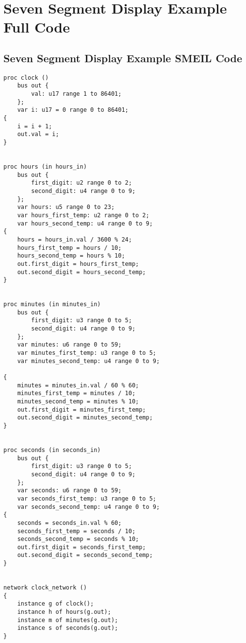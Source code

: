 \chapter{Seven Segment Display Example Full Code}
\label{app:seven_segments}
\section*{Seven Segment Display Example SMEIL Code}
\begin{verbatim}
proc clock ()
    bus out {
        val: u17 range 1 to 86401;
    };
    var i: u17 = 0 range 0 to 86401;
{
    i = i + 1;
    out.val = i;
}


proc hours (in hours_in)
    bus out {
        first_digit: u2 range 0 to 2;
        second_digit: u4 range 0 to 9;
    };
    var hours: u5 range 0 to 23;
    var hours_first_temp: u2 range 0 to 2;
    var hours_second_temp: u4 range 0 to 9;
{
    hours = hours_in.val / 3600 % 24;
    hours_first_temp = hours / 10;
    hours_second_temp = hours % 10;
    out.first_digit = hours_first_temp;
    out.second_digit = hours_second_temp;
}


proc minutes (in minutes_in)
    bus out {
        first_digit: u3 range 0 to 5;
        second_digit: u4 range 0 to 9;
    };
    var minutes: u6 range 0 to 59;
    var minutes_first_temp: u3 range 0 to 5;
    var minutes_second_temp: u4 range 0 to 9;

{
    minutes = minutes_in.val / 60 % 60;
    minutes_first_temp = minutes / 10;
    minutes_second_temp = minutes % 10;
    out.first_digit = minutes_first_temp;
    out.second_digit = minutes_second_temp;
}


proc seconds (in seconds_in)
    bus out {
        first_digit: u3 range 0 to 5;
        second_digit: u4 range 0 to 9;
    };
    var seconds: u6 range 0 to 59;
    var seconds_first_temp: u3 range 0 to 5;
    var seconds_second_temp: u4 range 0 to 9;
{
    seconds = seconds_in.val % 60;
    seconds_first_temp = seconds / 10;
    seconds_second_temp = seconds % 10;
    out.first_digit = seconds_first_temp;
    out.second_digit = seconds_second_temp;
}


network clock_network ()
{
    instance g of clock();
    instance h of hours(g.out);
    instance m of minutes(g.out);
    instance s of seconds(g.out);
}

\end{verbatim}

